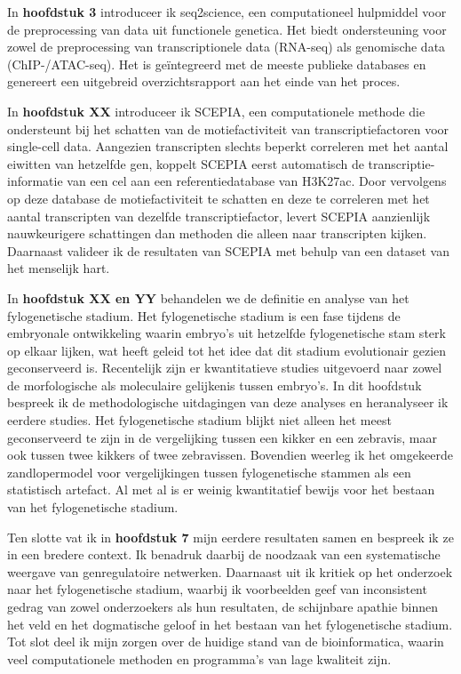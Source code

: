 In \textbf{hoofdstuk 3} introduceer ik seq2science, een computationeel hulpmiddel voor de preprocessing van data uit functionele genetica. Het biedt ondersteuning voor zowel de preprocessing van transcriptionele data (RNA-seq) als genomische data (ChIP-/ATAC-seq). Het is geïntegreerd met de meeste publieke databases en genereert een uitgebreid overzichtsrapport aan het einde van het proces.

In \textbf{hoofdstuk XX} introduceer ik SCEPIA, een computationele methode die ondersteunt bij het schatten van de motiefactiviteit van transcriptiefactoren voor single-cell data. Aangezien transcripten slechts beperkt correleren met het aantal eiwitten van hetzelfde gen, koppelt SCEPIA eerst automatisch de transcriptie-informatie van een cel aan een referentiedatabase van H3K27ac. Door vervolgens op deze database de motiefactiviteit te schatten en deze te correleren met het aantal transcripten van dezelfde transcriptiefactor, levert SCEPIA aanzienlijk nauwkeurigere schattingen dan methoden die alleen naar transcripten kijken. Daarnaast valideer ik de resultaten van SCEPIA met behulp van een dataset van het menselijk hart.

In \textbf{hoofdstuk XX en YY} behandelen we de definitie en analyse van het fylogenetische stadium. Het fylogenetische stadium is een fase tijdens de embryonale ontwikkeling waarin embryo's uit hetzelfde fylogenetische stam sterk op elkaar lijken, wat heeft geleid tot het idee dat dit stadium evolutionair gezien geconserveerd is. Recentelijk zijn er kwantitatieve studies uitgevoerd naar zowel de morfologische als moleculaire gelijkenis tussen embryo's. In dit hoofdstuk bespreek ik de methodologische uitdagingen van deze analyses en heranalyseer ik eerdere studies. Het fylogenetische stadium blijkt niet alleen het meest geconserveerd te zijn in de vergelijking tussen een kikker en een zebravis, maar ook tussen twee kikkers of twee zebravissen. Bovendien weerleg ik het omgekeerde zandlopermodel voor vergelijkingen tussen fylogenetische stammen als een statistisch artefact. Al met al is er weinig kwantitatief bewijs voor het bestaan van het fylogenetische stadium.

Ten slotte vat ik in \textbf{hoofdstuk 7} mijn eerdere resultaten samen en bespreek ik ze in een bredere context. Ik benadruk daarbij de noodzaak van een systematische weergave van genregulatoire netwerken. Daarnaast uit ik kritiek op het onderzoek naar het fylogenetische stadium, waarbij ik voorbeelden geef van inconsistent gedrag van zowel onderzoekers als hun resultaten, de schijnbare apathie binnen het veld en het dogmatische geloof in het bestaan van het fylogenetische stadium. Tot slot deel ik mijn zorgen over de huidige stand van de bioinformatica, waarin veel computationele methoden en programma's van lage kwaliteit zijn.
